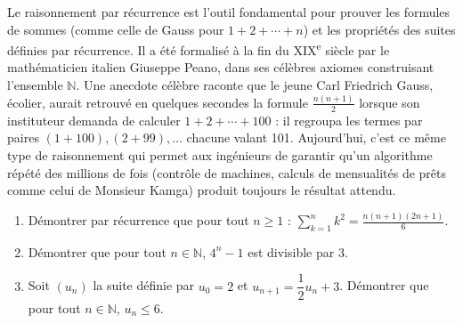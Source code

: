 \documentclass[11pt]{article}
\begin{document}
\begin{savaistu}
Le raisonnement par récurrence est l'outil fondamental pour prouver les formules de sommes (comme celle de Gauss pour $1 + 2 + \cdots + n$) et les propriétés des suites définies par récurrence. Il a été formalisé à la fin du XIX\textsuperscript{e} siècle par le mathématicien italien Giuseppe Peano, dans ses célèbres axiomes construisant l'ensemble $\mathbb{N}$. Une anecdote célèbre raconte que le jeune Carl Friedrich Gauss, écolier, aurait retrouvé en quelques secondes la formule $\frac{n(n+1)}{2}$ lorsque son instituteur demanda de calculer $1 + 2 + \cdots + 100$ : il regroupa les termes par paires $(1 + 100), (2 + 99), \ldots$ chacune valant 101. Aujourd'hui, c'est ce même type de raisonnement qui permet aux ingénieurs de garantir qu'un algorithme répété des millions de fois (contrôle de machines, calculs de mensualités de prêts comme celui de Monsieur Kamga) produit toujours le résultat attendu.
\end{savaistu}

\begin{exercice}[Entraînement]
\begin{enumerate}
\item Démontrer par récurrence que pour tout $n \geq 1$ : $\displaystyle\sum_{k=1}^{n} k^2 = \frac{n(n+1)(2n+1)}{6}$.
\item Démontrer que pour tout $n \in \mathbb{N}$, $4^n - 1$ est divisible par 3.
\item Soit $(u_n)$ la suite définie par $u_0 = 2$ et $u_{n+1} = \dfrac{1}{2}u_n + 3$. Démontrer que pour tout $n \in \mathbb{N}$, $u_n \leq 6$.
\end{enumerate}
\end{exercice}
\end{document}

